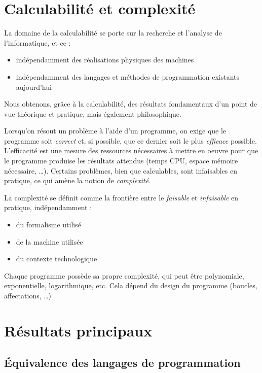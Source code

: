\section{Calculabilité et complexité}
\label{sec:calculabilite_et_complexite}

La domaine de la calculabilité se porte sur la recherche et l'analyse de l'informatique, et ce :

\begin{itemize}
	\item indépendamment des réalisations physiques des machines
	\item indépendamment des langages et méthodes de programmation existants aujourd'hui
\end{itemize}

Nous obtenons, grâce à la calculabilité, des résultats fondamentaux d'un point de vue théorique et pratique, mais également philosophique.

Lorsqu'on résout un problème à l'aide d'un programme, on exige que le programme soit \textit{correct} et, si possible, 
que ce dernier soit le plus \textit{efficace} possible. L'efficacité est une mesure des ressources nécessaires à mettre 
en oeuvre pour que le programme produise les résultats attendus (temps CPU, espace mémoire nécessaire, \ldots{}). 
Certains problèmes, bien que calculables, sont infaisables en pratique, ce qui amène la notion de \textit{complexité}.

La complexité se définit comme la frontière entre le \textit{faisable} et \textit{infaisable} en pratique, indépendamment :

\begin{itemize}
	\item du formalisme utilisé
	\item de la machine utilisée
	\item du contexte technologique
\end{itemize}

Chaque programme possède sa propre complexité, qui peut être polynomiale, exponentielle, logarithmique, etc. Cela dépend du design du programme (boucles, affectations, \ldots)

\section{Résultats principaux}
\label{sec:r_sultat_principaux}

\subsection{Équivalence des langages de programmation}
\label{subsec:equivalence_des_langages_de_programmation}

